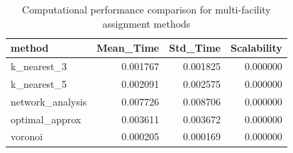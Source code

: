 \begin{table}
\caption{Computational performance comparison for multi-facility assignment methods}
\label{tab:multifacility_performance}
\begin{tabular}{lrrr}
\toprule
method & Mean_Time & Std_Time & Scalability \\
\midrule
k_nearest_3 & 0.001767 & 0.001825 & 0.000000 \\
k_nearest_5 & 0.002091 & 0.002575 & 0.000000 \\
network_analysis & 0.007726 & 0.008706 & 0.000000 \\
optimal_approx & 0.003611 & 0.003672 & 0.000000 \\
voronoi & 0.000205 & 0.000169 & 0.000000 \\
\bottomrule
\end{tabular}
\end{table}
